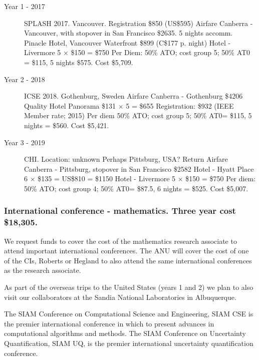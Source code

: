 \documentclass[a4paper,fontsize=12pt]{scrartcl}
\begin{document}
\begin{description}
\item[Year 1 - 2017] SPLASH 2017.
Vancouver. 
Registration \$850 (US\$595) 
Airfare Canberra - Vancouver, with stopover in San Francisco \$2635. 
5 nights accomm. Pinacle Hotel, Vancouver Waterfront \$899 (C\$177 p. night)
Hotel - Livermore 5 $\times$  \$150 = \$750
Per Diem: 50\% ATO; cost group 5; 50\% AT0 = \$115, 
5 nights \$575. Cost \$5,709.


\item[Year 2 - 2018] ICSE 2018.
Gothenburg, Sweden
Airfare Canberra - Gothenburg \$4206
Quality Hotel Panorama \$131 $\times$ 5 = \$655
Registration: \$932 (IEEE Member rate; 2015)
Per diem 50\% ATO; cost group 5; 50\% AT0= \$115, 
5 nights = \$560. Cost \$5,421.


\item[Year 3 - 2019] CHI.
Location: unknown
Perhaps Pittsburg, USA?
Return Airfare Canberra - Pittsburg, stopover in San Francisco  \$2582
Hotel - Hyatt Place 6 $\times$ \$135 = US\$810 = \$1150
Hotel - Livermore 5 $\times$  \$150 = \$750
Per diem: 50\% ATO; cost group 4; 50\% AT0= \$87.5, 6 nights = \$525. Cost \$5,007.

\end{description}


\subsubsection*{International conference - mathematics. Three year cost \$18,305.}


We request funds to cover the cost of the mathematics research associate to attend important international conferences.  The ANU will cover the cost of one of the CIs, Roberts or Hegland to also attend the same international conferences as the research associate. 

As part of the overseas trips to the United States (years 1 and 2) we plan to also visit our collaborators at the Sandia National Laboratories in Albuquerque. 

The SIAM Conference on Computational Science and Engineering, SIAM CSE is the premier international conference in which to present advances in computational algorithms and methods. The SIAM Conference on Uncertainty Quantification, SIAM UQ, is the premier international uncertainty quantification conference.
\end{document}
